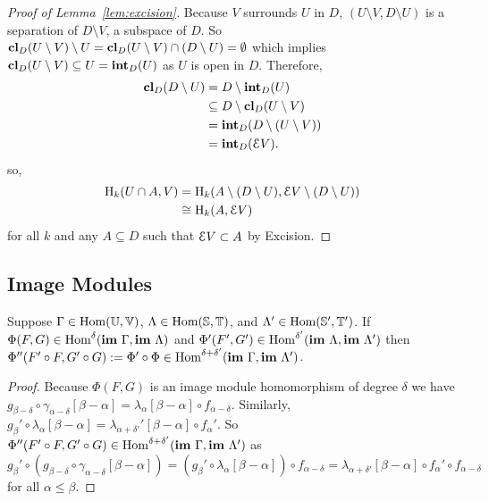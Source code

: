 \begin{proof}[Proof of Lemma~\ref{lem:excision}]
  Because $V$ surrounds $U$ in $D$, $(U\setminus V, D\setminus U)$ is a separation of $D\setminus V$, a subspace of $D$.
  So $\mathbf{cl}_D(U\setminus V)\setminus U = \mathbf{cl}_D(U\setminus V) \cap (D\setminus U) = \emptyset$ which implies $\mathbf{cl}_D(U\setminus V)\subseteq U = \mathbf{int}_D(U)$ as $U$ is open in $D$.
  Therefore,
  \begin{align*}
    \mathbf{cl}_D(D\setminus U) &= D\setminus \mathbf{int}_D(U)\\
                        &\subseteq D\setminus \mathbf{cl}_D(U\setminus V)\\
                        &= \mathbf{int}_D(D\setminus (U\setminus V))\\
                        &= \mathbf{int}_D(\mathcal{E} V).
  \end{align*}
  so,
  \begin{align*}
    \mathrm{H}_k(U\cap A, V) &= \mathrm{H}_k(A\setminus (D\setminus U), \mathcal{E} V\setminus (D\setminus U))\\
      &\cong \mathrm{H}_k(A, \mathcal{E} V)
  \end{align*}
  for all $k$ and any $A\subseteq D$ such that $\mathcal{E} V\subset A$ by Excision.
\end{proof}

\subsection{Image Modules}

\begin{lemma}\label{lem:image_composition}
  Suppose $\Gamma\in\mathrm{Hom}(\mathbb{U},\mathbb{V})$, $\Lambda\in\mathrm{Hom}(\mathbb{S},\mathbb{T})$, and $\Lambda'\in\mathrm{Hom}(\mathbb{S}',\mathbb{T}')$.
  If $\Phi(F, G)\in\mathrm{Hom}^\delta(\mathbf{im}~\Gamma, \mathbf{im}~\Lambda)$ and $\Phi'(F', G')\in\mathrm{Hom}^{\delta'}(\mathbf{im}~\Lambda, \mathbf{im}~\Lambda')$ then $\Phi''(F'\circ F, G'\circ G) := \Phi'\circ\Phi\in\mathrm{Hom}^{\delta+\delta'}(\mathbf{im}~\Gamma,\mathbf{im}~\Lambda')$.
\end{lemma}
\begin{proof}
  Because $\Phi(F, G)$ is an image module homomorphism of degree $\delta$ we have $g_{\beta-\delta}\circ\gamma_{\alpha-\delta}[\beta-\alpha] = \lambda_\alpha[\beta-\alpha]\circ f_{\alpha-\delta}$.
  Similarly, $g_{\beta}'\circ\lambda_{\alpha}[\beta-\alpha] = \lambda_{\alpha +\delta'}'[\beta-\alpha]\circ f_{\alpha}'$.
  So $\Phi''(F'\circ F, G'\circ G)\in\mathrm{Hom}^{\delta+\delta'}(\mathbf{im}~\Gamma,\mathbf{im}~\Lambda')$ as
  \[ g_\beta'\circ (g_{\beta-\delta}\circ \gamma_{\alpha-\delta}[\beta-\alpha]) = (g_\beta'\circ \lambda_\alpha[\beta-\alpha])\circ f_{\alpha-\delta} =\lambda_{\alpha+\delta'}[\beta-\alpha]\circ f_\alpha'\circ f_{\alpha-\delta}\]
  for all $\alpha\leq\beta$.
\end{proof}


